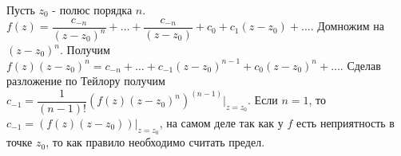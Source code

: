 \begin{proposal}
	Пусть $z_0$ - полюс порядка $n$. $f(z) = \dfrac{c_{-n}}{(z - z_0)^n} + \dots + \dfrac{c_{-n}}{(z - z_0)} + c_0 + c_1(z - z_0) + \dots$. Домножим на $(z - z_0)^n$. Получим $f(z)(z-z_0)^n = c_{-n} + \dots + c_{-1}(z-z_0)^{n-1} + c_0(z-z_0)^n + \dots$. Сделав разложение по Тейлору получим $c_{-1} = \dfrac{1}{(n-1)!}(f(z)(z-z_0)^n)^{(n-1)} |_{z=z_0}$. Если $n=1$, то $c_{-1} = (f(z)(z - z_0))|_{z=z_0}$, на самом деле так как у $f$ есть неприятность в точке $z_0$, то как правило необходимо считать предел.
\end{proposal}

